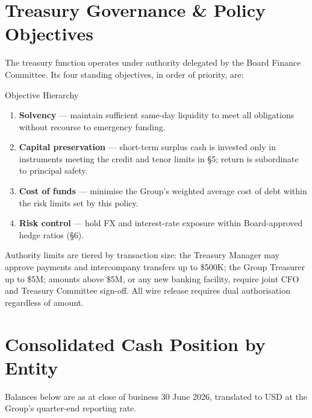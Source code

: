 \documentclass[11pt,a4paper]{scrreprt}
\begin{document}
\section{Treasury Governance \& Policy Objectives}

The treasury function operates under authority delegated by the Board Finance Committee.
Its four standing objectives, in order of priority, are:

\begin{policybox}{Objective Hierarchy}
\begin{enumerate}[leftmargin=1.4em,label=\arabic*.,itemsep=3pt]
  \item \textbf{Solvency} --- maintain sufficient same-day liquidity to meet all obligations
        without recourse to emergency funding.
  \item \textbf{Capital preservation} --- short-term surplus cash is invested only in
        instruments meeting the credit and tenor limits in \S5; return is subordinate to
        principal safety.
  \item \textbf{Cost of funds} --- minimise the Group's weighted average cost of debt
        within the risk limits set by this policy.
  \item \textbf{Risk control} --- hold FX and interest-rate exposure within Board-approved
        hedge ratios (\S6).
\end{enumerate}
\end{policybox}

\vspace{0.4cm}
\noindent Authority limits are tiered by transaction size: the Treasury Manager may
approve payments and intercompany transfers up to \$500K; the Group Treasurer up to \$5M;
amounts above \$5M, or any new banking facility, require joint CFO and Treasury Committee
sign-off. All wire release requires dual authorisation regardless of amount.

\section{Consolidated Cash Position by Entity}

\noindent Balances below are as at close of business 30 June 2026, translated to USD at
the Group's quarter-end reporting rate.
\end{document}
